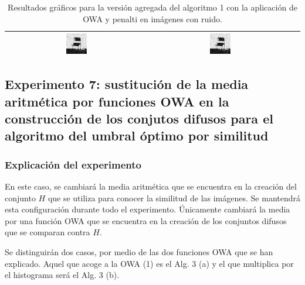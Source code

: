 \begin{table}
\begin{tabular}{c|c|c}
\includegraphics[width=0.15\textwidth]{img/res/e6/alg1agregadoowa2chairsp020.jpg} &
\includegraphics[width=0.15\textwidth]{img/res/e6/alg1agregadoowa3chairsp020.jpg} \\\hline
\end{tabular}
\caption{Resultados gráficos para la versión agregada del algoritmo 1 con la aplicación de OWA y penalti en imágenes con ruido.\label{tab:resultexp6imagenesruido}}
\end{table}


\subsection{Experimento 7: sustitución de la media aritmética por funciones OWA en la construcción de los conjutos difusos para el algoritmo del umbral óptimo por similitud}
\subsubsection{Explicación del experimento}
En este caso, se cambiará la media aritmética que se encuentra en la creación del conjunto $H$ que se utiliza para conocer la similitud de las imágenes. Se mantendrá esta configuración durante todo el experimento. Únicamente cambiará la media por una función OWA que se encuentra en la creación de los conjuntos difusos que se comparan contra $H$.

Se distinguirán dos casos, por medio de las dos funciones OWA que se han explicado. Aquel que acoge a la OWA (1) es el Alg. 3 (a) y el que multiplica por el histograma será el Alg. 3 (b).

